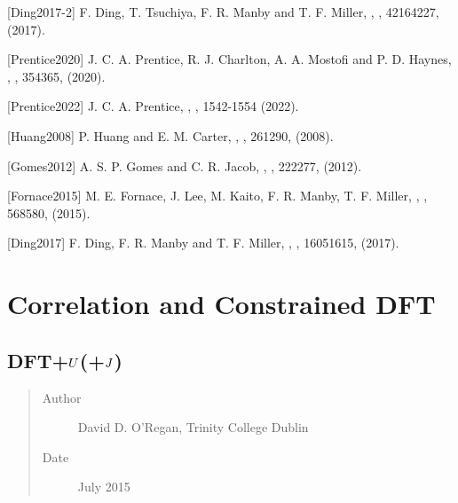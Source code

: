 \documentclass[letterpaper,10pt,english]{sphinxmanual}
\begin{document}
{[}Ding2017-2{]} F. Ding, T. Tsuchiya, F. R. Manby and T. F. Miller, , , 4216\textendash{}4227, (2017).

{[}Prentice2020{]} J. C. A. Prentice, R. J. Charlton, A. A. Mostofi and P. D. Haynes, , , 354\textendash{}365, (2020).

{[}Prentice2022{]} J. C. A. Prentice, , , 1542-1554 (2022).

{[}Huang2008{]} P. Huang and E. M. Carter, , , 261\textendash{}290, (2008).

{[}Gomes2012{]} A. S. P. Gomes and C. R. Jacob, , , 222\textendash{}277, (2012).

{[}Fornace2015{]} M. E. Fornace, J. Lee, M. Kaito, F. R. Manby, T. F. Miller, , , 568\textendash{}580, (2015).

{[}Ding2017{]} F. Ding, F. R. Manby and T. F. Miller, , , 1605\textendash{}1615, (2017).


\chapter{Correlation and Constrained DFT}
\label{\detokenize{index_correlation_constrained::doc}}\label{\detokenize{index_correlation_constrained:correlation-and-constrained-dft}}

\section{DFT+\protect\(U\protect\)(+\protect\(J\protect\))}
\label{\detokenize{ONETEP_DFT+U_README:dft}}\label{\detokenize{ONETEP_DFT+U_README::doc}}\begin{quote}\begin{description}
\item[{Author}] \leavevmode
David D. O’Regan, Trinity College Dublin

\item[{Date}] \leavevmode
July 2015

\end{description}\end{quote}
\end{document}
